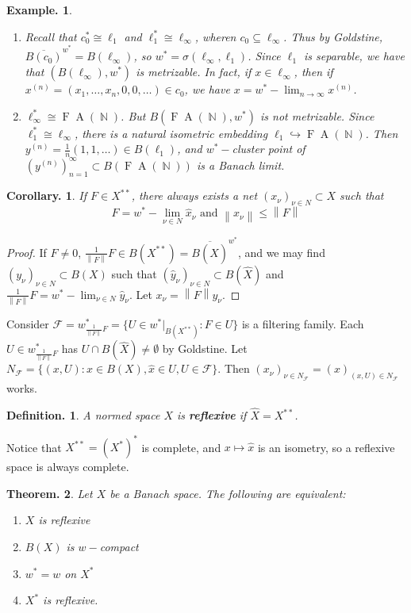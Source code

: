 \documentclass[11pt, a4paper]{memoir}
\DeclareMathOperator{\N}{{\mathbb{N}}}
\newcommand{\norm}[1]{\ensuremath{\left\lVert#1\right\rVert}}
\theoremstyle{change}
\newtheorem{theorem}{Theorem.}[section]
\newtheorem{corollary}[theorem]{Corollary.}
\theoremstyle{plain}
\theoremstyle{nonumberplain}
\newtheorem{definition}{Definition.}
\newtheorem{example}{Example.}
\newtheorem{proof}{Proof}
\newcommand{\FA}{\ensuremath{\operatorname{F}\!\operatorname{A}}}
\numberwithin{equation}{section}
\begin{document}
\begin{example}
    \begin{enumerate}[nl,r]
        \item Recall that $c_0^*\cong\ell_1$ and $\ell_1^*\cong\ell_\infty$, wheren $c_0\subseteq\ell_\infty$.
            Thus by Goldstine, $\overline{B(c_0)}^{w^*}=B(\ell_\infty)$, so $w^*=\sigma(\ell_\infty,\ell_1)$.
            Since $\ell_1$ is separable, we have that $(B(\ell_\infty),w^*)$ is metrizable.
            In fact, if $x\in\ell_\infty$, then if $x^{(n)}=(x_1,\ldots,x_n,0,0,\ldots)\in c_0$, we have $x=w^*-\lim_{n\to\infty}x^{(n)}$.
        \item $\ell_\infty^*\cong\FA(\N)$.
            But $B(\FA(\N),w^*)$ is not metrizable.
            Since $\ell_1^*\cong\ell_\infty$, there is a natural isometric embedding $\ell_1\hookrightarrow\FA(\N)$.
            Then $y^{(n)}=\frac{1}{n}(1,1,\ldots)\in B(\ell_1)$, and $w^*-$cluster point of $(y^{(n)})_{n=1}^\infty\subset B(\FA(\N))$ is a Banach limit.
    \end{enumerate}
\end{example}
\begin{corollary}
    If $F\in X^{**}$, there always exists a net $(x_\nu)_{\nu\in N}\subset X$ such that
    \begin{equation*}
        F=w^*-\lim_{\nu\in N}\hat x_\nu\text{ and }\norm{x_\nu}\leq\norm{F}
    \end{equation*}
\end{corollary}
\begin{proof}
    If $F\neq 0$, $\frac{1}{\norm{F}}F\in B(X^{**})=\overline{B(\hat X)}^{w^*}$, and we may find $(y_\nu)_{\nu\in N}\subset B(X)$ such that $(\hat y_\nu)_{\nu\in N}\subset B(\hat X)$ and $\frac{1}{\norm{F}}F=w^*-\lim_{\nu\in N}\hat y_\nu$.
    Let $x_\nu=\norm{F}y_\nu$.
\end{proof}
Consider $\mathcal{F}=w^*_{\frac{1}{\norm{F}}F}=\{U\in w^*|_{B(X^{**})}:F\in U\}$ is a filtering family.
Each $U\in w^*_{\frac{1}{\norm{F}}F}$ has $U\cap B(\hat X)\neq\emptyset$ by Goldstine.
Let $N_{\mathcal{F}}=\{(x,U):x\in B(X),\hat x\in U,U\in\mathcal{F}\}$.
Then $(x_\nu)_{\nu\in N_{\mathcal{F}}}=(x)_{(x,U)\in N_{\mathcal{F}}}$ works.
\begin{definition}
    A normed space $X$ is \textbf{reflexive} if $\hat X=X^{**}$.
\end{definition}
Notice that $X^{**}=(X^*)^*$ is complete, and $x\mapsto\hat x$ is an isometry, so a reflexive space is always complete.
\begin{theorem}
    Let $X$ be a Banach space.
    The following are equivalent:
    \begin{enumerate}[nl,r]
        \item $X$ is reflexive
        \item $B(X)$ is $w-$compact
        \item $w^*=w$ on $X^*$
        \item $X^*$ is reflexive.
    \end{enumerate}
\end{theorem}
\end{document}

